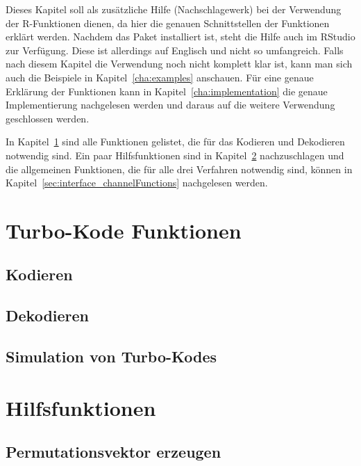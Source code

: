 Dieses Kapitel soll als zusätzliche Hilfe (Nachschlagewerk) bei der Verwendung der R-Funktionen dienen, da hier die genauen Schnittstellen der Funktionen erklärt werden. Nachdem das Paket installiert ist, steht die Hilfe auch im RStudio zur Verfügung. Diese ist allerdings auf Englisch und nicht so umfangreich. Falls nach diesem Kapitel die Verwendung noch nicht komplett klar ist, kann man sich auch die Beispiele in Kapitel~\ref{cha:examples} anschauen. Für eine genaue Erklärung der Funktionen kann in Kapitel~\ref{cha:implementation} die genaue Implementierung nachgelesen werden und daraus auf die weitere Verwendung geschlossen werden.

In Kapitel~\ref{sec:interface_turboFunctions} sind alle Funktionen gelistet, die für das Kodieren und Dekodieren notwendig sind. Ein paar Hilfsfunktionen sind in Kapitel~\ref{sec:interface_helperFunctions} nachzuschlagen und die allgemeinen Funktionen, die für alle drei Verfahren notwendig sind, können in Kapitel~\ref{sec:interface_channelFunctions} nachgelesen werden. 
\newpage

\section{Turbo-Kode Funktionen}
\label{sec:interface_turboFunctions}

\subsection{Kodieren}
\label{sec:interface_encode}


\subsection{Dekodieren}
\label{sec:interface_decode}

\newpage

\subsection{Simulation von Turbo-Kodes}
\label{sec:interface_simulation}


\section{Hilfsfunktionen}
\label{sec:interface_helperFunctions}

\subsection{Permutationsvektor erzeugen}
\label{sec:interface_permutation}


